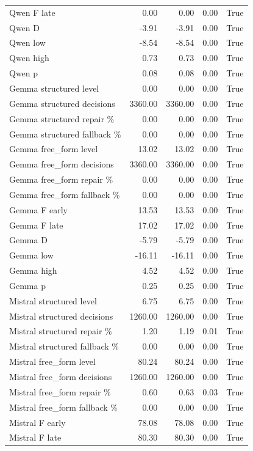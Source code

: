 \begin{longtable}{lrrrr}
Qwen F late & 0.00 & 0.00 & 0.00 & True \\
Qwen D & -3.91 & -3.91 & 0.00 & True \\
Qwen low & -8.54 & -8.54 & 0.00 & True \\
Qwen high & 0.73 & 0.73 & 0.00 & True \\
Qwen p & 0.08 & 0.08 & 0.00 & True \\
Gemma structured level & 0.00 & 0.00 & 0.00 & True \\
Gemma structured decisions & 3360.00 & 3360.00 & 0.00 & True \\
Gemma structured repair \% & 0.00 & 0.00 & 0.00 & True \\
Gemma structured fallback \% & 0.00 & 0.00 & 0.00 & True \\
Gemma free\_form level & 13.02 & 13.02 & 0.00 & True \\
Gemma free\_form decisions & 3360.00 & 3360.00 & 0.00 & True \\
Gemma free\_form repair \% & 0.00 & 0.00 & 0.00 & True \\
Gemma free\_form fallback \% & 0.00 & 0.00 & 0.00 & True \\
Gemma F early & 13.53 & 13.53 & 0.00 & True \\
Gemma F late & 17.02 & 17.02 & 0.00 & True \\
Gemma D & -5.79 & -5.79 & 0.00 & True \\
Gemma low & -16.11 & -16.11 & 0.00 & True \\
Gemma high & 4.52 & 4.52 & 0.00 & True \\
Gemma p & 0.25 & 0.25 & 0.00 & True \\
Mistral structured level & 6.75 & 6.75 & 0.00 & True \\
Mistral structured decisions & 1260.00 & 1260.00 & 0.00 & True \\
Mistral structured repair \% & 1.20 & 1.19 & 0.01 & True \\
Mistral structured fallback \% & 0.00 & 0.00 & 0.00 & True \\
Mistral free\_form level & 80.24 & 80.24 & 0.00 & True \\
Mistral free\_form decisions & 1260.00 & 1260.00 & 0.00 & True \\
Mistral free\_form repair \% & 0.60 & 0.63 & 0.03 & True \\
Mistral free\_form fallback \% & 0.00 & 0.00 & 0.00 & True \\
Mistral F early & 78.08 & 78.08 & 0.00 & True \\
Mistral F late & 80.30 & 80.30 & 0.00 & True \\

\end{longtable}
